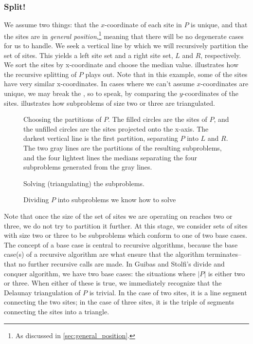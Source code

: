 \documentclass[12pt,twoside]{reedthesis}
\begin{document}
  \subsubsection{Split!}
  \label{ssub:split}
    We assume two things: that the $x$-coordinate of each site in $P$ is unique, and that the sites are in \emph{general position},\footnote{As discussed in \cref{sec:general_position}.} meaning that there will be no degenerate cases for us to handle. We seek a vertical line by which we will recursively partition the set of sites. This yields a left site set and a right site set, $L$ and $R$, respectively. We sort the sites by x-coordinate and choose the median value.  illustrates how the recursive splitting of $P$ plays out. Note that in this example, some of the sites have very similar x-coordinates. In cases where we can't assume $x$-coordinates are unique, we may break the , so to speak, by comparing the $y$-coordinates of the sites.  illustrates how subproblems of size two or three are triangulated. \par 
    \begin{figure}[!htb]
    \centering
      \begin{subtable}{\textwidth}
        \centering
        
        \caption{Choosing the partitions of $P$. The filled circles are the sites of $P$, and the unfilled circles are the sites projected onto the x-axis. The darkest vertical line is the first partition, separating $P$ into $L$ and $R$. The two gray lines are the partitions of the resulting subproblems, and the four lightest lines the medians separating the four subproblems generated from the gray lines.}
        \label{fig:del_partition0}
      \end{subtable}

      \begin{subtable}{\textwidth}
        \centering
        
        \caption{Solving (triangulating) the subproblems.}
        \label{fig:del_partition1}
      \end{subtable}
      \caption{Dividing $P$ into subproblems we know how to solve}
      \label{fig:div_and_triangulate}
    \end{figure}

    Note that once the size of the set of sites we are operating on reaches two or three, we do not try to partition it further. At this stage, we consider sets of sites with size two or three to be subproblems which conform to one of two base cases. The concept of a base case is central to recursive algorithms, because the base case(s) of a recursive algorithm are what ensure that the algorithm terminates-- that no further recursive calls are made. In Guibas and Stolfi's divide and conquer algorithm, we have two base cases: the situations where $|P|$ is either two or three. When either of these is true, we immediately recognize that the Delaunay triangulation of $P$ is trivial. In the case of two sites, it is a line segment connecting the two sites; in the case of three sites, it is the triple of segments connecting the sites into a triangle.\par
\end{document}
